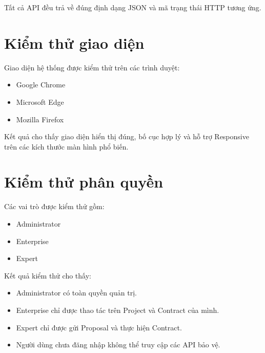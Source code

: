 Tất cả API đều trả về đúng định dạng JSON và mã trạng thái HTTP tương ứng.


\section{Kiểm thử giao diện}

Giao diện hệ thống được kiểm thử trên các trình duyệt:

\begin{itemize}

\item Google Chrome

\item Microsoft Edge

\item Mozilla Firefox

\end{itemize}

Kết quả cho thấy giao diện hiển thị đúng, bố cục hợp lý và hỗ trợ Responsive
trên các kích thước màn hình phổ biến.


\section{Kiểm thử phân quyền}

Các vai trò được kiểm thử gồm:

\begin{itemize}

\item Administrator

\item Enterprise

\item Expert

\end{itemize}

Kết quả kiểm thử cho thấy:

\begin{itemize}

\item Administrator có toàn quyền quản trị.

\item Enterprise chỉ được thao tác trên Project và Contract của mình.

\item Expert chỉ được gửi Proposal và thực hiện Contract.

\item Người dùng chưa đăng nhập không thể truy cập các API bảo vệ.

\end{itemize}


